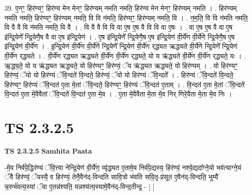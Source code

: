 \documentclass[17pt]{extarticle}
\begin{document}
39. ए॒नꣳ॒॒ हिर॑ण्यꣳ॒॒ हिर॑ण्य मेन मेनꣳ॒॒ हिर॑ण्यम् नमति नमति॒ हिर॑ण्य मेन मेनꣳ॒॒ हिर॑ण्यम् नमति । . हिर॑ण्यम् नमति नमति॒ हिर॑ण्यꣳ॒॒ हिर॑ण्यम् नमति॒ वि वि न॑मति॒ हिर॑ण्यꣳ॒॒ हिर॑ण्यम् नमति॒ वि । . न॒म॒ति॒ वि वि न॑मति नमति॒ वि वै वै वि न॑मति नमति॒ वि वै । . वि वै वै वि वि वा ए॒ष ए॒ष वै वि वि वा ए॒षः । . वा ए॒ष ए॒ष वै वा ए॒ष इ॑न्द्रि॒येणे᳚ न्द्रि॒येणै॒ष वै वा ए॒ष इ॑न्द्रि॒येण॑ । . ए॒ष इ॑न्द्रि॒येणे᳚ न्द्रि॒येणै॒ष ए॒ष इ॑न्द्रि॒येण॑ वी॒र्ये॑ण वी॒र्ये॑णे न्द्रि॒येणै॒ष ए॒ष इ॑न्द्रि॒येण॑ वी॒र्ये॑ण । . इ॒न्द्रि॒येण॑ वी॒र्ये॑ण वी॒र्ये॑णे न्द्रि॒येणे᳚ न्द्रि॒येण॑ वी॒र्ये॑ण र्‌द्ध्यत ऋद्ध्यते वी॒र्ये॑णे न्द्रि॒येणे᳚ न्द्रि॒येण॑ वी॒र्ये॑ण र्‌द्ध्यते । . वी॒र्ये॑ण र्‌द्ध्यत ऋद्ध्यते वी॒र्ये॑ण वी॒र्ये॑ण र्‌द्ध्यते॒ यो य ऋ॑द्ध्यते वी॒र्ये॑ण वी॒र्ये॑ण र्‌द्ध्यते॒ यः । . ऋ॒द्ध्य॒ते॒ यो य ऋ॑द्ध्यत ऋद्ध्यते॒ यो हिर॑ण्यꣳ॒॒ हिर॑ण्यं॒ ॅय ऋ॑द्ध्यत ऋद्ध्यते॒ यो हिर॑ण्यम् । . यो हिर॑ण्यꣳ॒॒ हिर॑ण्यं॒ ॅयो यो हिर॑ण्यं ॅवि॒न्दते॑ वि॒न्दते॒ हिर॑ण्यं॒ ॅयो यो हिर॑ण्यं ॅवि॒न्दते᳚ । . हिर॑ण्यं ॅवि॒न्दते॑ वि॒न्दते॒ हिर॑ण्यꣳ॒॒ हिर॑ण्यं ॅवि॒न्दत॑ ए॒ता मे॒तां ॅवि॒न्दते॒ हिर॑ण्यꣳ॒॒ हिर॑ण्यं ॅवि॒न्दत॑ ए॒ताम् । . वि॒न्दत॑ ए॒ता मे॒तां ॅवि॒न्दते॑ वि॒न्दत॑ ए॒ता मे॒वैवैतां ॅवि॒न्दते॑ वि॒न्दत॑ ए॒ता मे॒व । . ए॒ता मे॒वैवैता मे॒ता मे॒व निर् णिरे॒वैता मे॒ता मे॒व निः । \newline
\pagebreak
{}

\section{ TS 2.3.2.5 }

\textbf{TS 2.3.2.5 } \newline
\textbf{Samhita Paata} \newline

-मे॒व निर्व॑पे॒द्धिर॑ण्यं ॅवि॒त्त्वा नेन्द्रि॒येण॑ वी॒र्ये॑ण॒ व्यृ॑द्ध्यत ए॒तामे॒व निर्व॑पे॒द्यस्य॒ हिर॑ण्यं॒ नश्ये॒द्यदा᳚ग्ने॒यो भव॑त्याग्ने॒यं ॅवै हिर॑ण्यं॒ ॅयस्यै॒ व हिर॑ण्यं॒ तेनै॒वैन॑द्-विन्दति सावि॒त्रो भ॑वति सवि॒तृ-प्र॑सूत ए॒वैन॑द्-विन्दति॒ भूम्यै॑ च॒रुर्भ॑वत्य॒स्यां ॅवा ए॒तन्न॑श्यति॒ यन्नश्य॑त्य॒स्यामे॒वैन॑द्-विन्द॒तीन्द्र॒ - [  ] \newline
\end{document}
